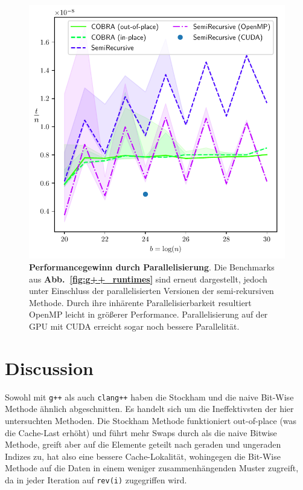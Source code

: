 \documentclass[10pt]{article}
\begin{document}
\begin{figure}[ht!]
\centering
  \includegraphics[width=6in]{results/open_mp_performance.pdf}
\caption{{\bf Performancegewinn durch Parallelisierung}. Die Benchmarks 
    aus {\bf Abb.~\ref{fig:g++_runtimes}} sind erneut dargestellt, jedoch unter Einschluss
    der parallelisierten Versionen der semi-rekursiven Methode. Durch ihre inhärente
    Parallelisierbarkeit resultiert OpenMP leicht in größerer Performance. 
    Parallelisierung auf der GPU mit CUDA erreicht sogar noch bessere Parallelität.  
  \label{fig:g++_parallel_runtimes}
}
\end{figure}

\section*{Discussion}
Sowohl mit {\tt g++} als auch {\tt clang++} haben die Stockham und die naive Bit-Wise Methode 
ähnlich abgeschnitten. Es handelt sich um die Ineffektivsten der hier untersuchten Methoden.
Die Stockham Methode funktioniert out-of-place (was die Cache-Last erhöht) und führt mehr Swaps 
durch als die naive Bitwise Methode, greift aber auf die Elemente geteilt nach geraden und ungeraden Indizes zu,
hat also eine bessere Cache-Lokalität, wohingegen die Bit-Wise Methode auf die Daten in einem weniger 
zusammenhängenden Muster zugreift, da in jeder Iteration auf {\tt rev(i)} zugegriffen wird.
\end{document}
